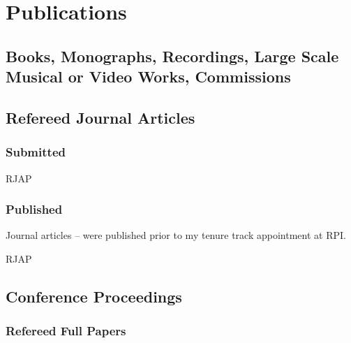 \documentclass[11 pt]{rpibio}
\begin{document}
\section{Publications}


\nocite{*}
\subsection{Books, Monographs, Recordings, Large Scale Musical or Video Works, Commissions}
\contributionstable

\subsection{Refereed Journal Articles}
\subsubsection{Submitted}
\begin{refcontext}[labelprefix=JS]{RJAP}
\printbibliography[filter=submitted_journals, heading=none,resetnumbers=true]
\end{refcontext}

\subsubsection{Published}
  \begin{framed}
  \centering
  Journal articles \cite{picuUltracompositesDesigningStochastic2016}--\cite{primePhysicalRegimeSensitivity2023} were published prior to my tenure track appointment at RPI.
  \end{framed}
  \begin{refcontext}[labelprefix=J]{RJAP}
    \printbibliography[filter=published_journals, heading=none,resetnumbers=true]
  \end{refcontext}

\subsection{Conference Proceedings}
  \subsubsection{Refereed Full Papers}
  \begin{refcontext}[labelprefix=C]
    \printbibliography[filter=refereed_conferences, heading=none,resetnumbers=true]
  \end{refcontext} 
\end{document}
